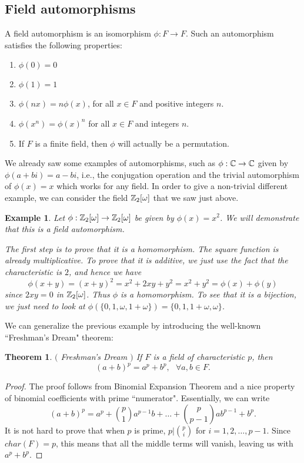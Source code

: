 \documentclass[12pt]{article}
\theoremstyle{plain}
\newtheorem{example}{Example}
\newtheorem{theorem}{Theorem}
\theoremstyle{definition}
\theoremstyle{remark}
\begin{document}
\subsection{Field automorphisms}
A field automorphism is an isomorphism $\phi:F\rightarrow F$.
Such an automorphism satisfies the following properties:
\begin{enumerate}
    \item $\phi(0)=0$
    \item $\phi(1)=1$
    \item $\phi(nx)=n\phi(x)$, for all $x\in F$ and positive integers $n$.
    \item $\phi(x^n)=\phi(x)^n$ for all $x\in F$ and integers $n$.
    \item If $F$ is a finite field, then $\phi$ will actually be a permutation.
\end{enumerate}
We already saw some examples of automorphisms, such as $\phi:\mathbb{C}\rightarrow \mathbb{C}$ given by $\phi(a+bi)=a-bi$, i.e., the conjugation operation and the trivial automorphism of $\phi(x)=x$ which works for any field. In order to give a non-trivial different example, we can consider the field $\mathbb{Z}_2[\omega] $  that we saw just above.
\begin{example}
Let $\phi:\mathbb{Z}_2[\omega]\rightarrow \mathbb{Z}_2[\omega]$ be given by $\phi(x)=x^2$. We will demonstrate that this is a field automorphism.

The first step is to prove that it is a homomorphism. The square function is already multiplicative. To prove that it is additive, we just use the fact that the characteristic is $2$, and hence we have
$$\phi(x+y) = (x+y)^2=x^2+2xy+y^2=x^2+y^2 = \phi(x)+\phi(y)$$
since $2xy=0$ in $\mathbb{Z}_2[\omega]$. Thus $\phi$ is a homomorphism. To see that it is a bijection, we just need to look at $\phi(\{0,1,\omega, 1+\omega\}) = \{0,1, 1+\omega, \omega\}$.
\end{example}
We can generalize the previous example by introducing the well-known ``Freshman's Dream" theorem:
\begin{theorem}$($ Freshman's Dream $)$
If $F$ is a field of characteristic $p$, then
$$(a+b)^p = a^p+b^p,  \:\:\:\forall a,b \in F.$$
\end{theorem}
\begin{proof}
The proof follows from Binomial Expansion Theorem and a nice property of binomial coefficients with prime ``numerator".
Essentially, we can write
$$(a+b)^p = a^p+\binom{p}{1}a^{p-1}b+\dots +\binom{p}{p-1}ab^{p-1}+b^p.$$
It is not hard to prove that when $p$ is prime, $p|\binom{p}{i}$ for $i=1, 2, \dots, p-1$. Since $char(F)=p$, this means that all the middle terms will vanish, leaving us with $a^p+b^p$.
\end{proof}
\end{document}
